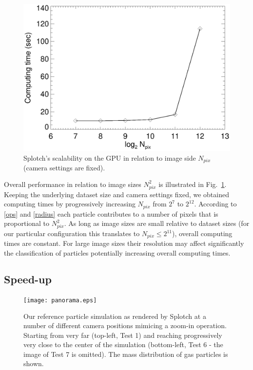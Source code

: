 \documentclass[preprint,5pt]{elsarticle}
\begin{document}
\begin{figure}
\includegraphics[scale=0.5]{pixelsK20-fig4.eps}
\caption{Splotch's scalability on the GPU in relation to image side $N_{pix}$ (camera settings are fixed).}
\label{fig:pixels}
\end{figure}

Overall performance in relation to image sizes $N_{pix}^2$ is illustrated in Fig.~\ref{fig:pixels}. Keeping the underlying dataset size and camera settings fixed, we obtained computing times by progressively increasing
$N_{pix}$ from ${2}^{7}$ to ${2}^{12}$. According to \eqref{ops} and \eqref{radius} each particle contributes to a number of pixels that is proportional to $N_{pix}^{2}$. As long as image sizes are small relative to dataset sizes (for our particular configuration this translates to $N_{pix} \le 2^{11}$), overall computing times are constant. For large image sizes their resolution may affect significantly the classification of particles potentially increasing overall computing times.

\subsection{Speed-up}
\label{sec:speed-up}
\begin{figure}
\texttt{[image: panorama.eps]}
\caption{Our reference particle simulation as rendered by Splotch at a number of different camera positions mimicing a zoom-in operation. Starting from very far (top-left, Test 1) and reaching progressively very close to the center of the simulation (bottom-left, Test 6 - the image of Test 7 is omitted). The mass distribution of gas particles is shown.}
\label{fig:panorama}
\end{figure}
\end{document}
